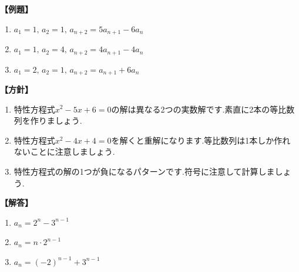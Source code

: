 \documentclass[dvipdfmx,a4paper,11pt,fleqn,openany]{jsbook}
\begin{document}
      \noindent \textbf{【例題】}
      \begin{enumerate}[label=(\arabic*),parsep=3pt]
        \item $\displaystyle a_1=1,\,a_2=1,\, a_{n+2}=5a_{n+1}-6a_n$
        \item $\displaystyle a_1=1,\,a_2=4,\, a_{n+2}=4a_{n+1}-4a_n$
        \item $\displaystyle a_1=2,\,a_2=1,\, a_{n+2}=a_{n+1}+6a_n$
      \end{enumerate}

      \noindent\textbf{【方針】}
      \begin{enumerate}[label=(\arabic*),parsep=3pt]
        \item 特性方程式$x^2-5x+6=0$の解は異なる2つの実数解です.素直に2本の等比数列を作りましょう.
        \item 特性方程式$x^2-4x+4=0$を解くと重解になります.等比数列は1本しか作れないことに注意しましょう.
        \item 特性方程式の解の1つが負になるパターンです.符号に注意して計算しましょう.
      \end{enumerate}

      \noindent\textbf{【解答】}
      \begin{enumerate}[label=(\arabic*),parsep=3pt]
        \item $\displaystyle a_n=2^n-3^{n-1}$
        \item $\displaystyle a_n=n\cdot2^{n-1}$
        \item $\displaystyle a_n=(-2)^{n-1}+3^{n-1}$
      \end{enumerate}
\end{document}
